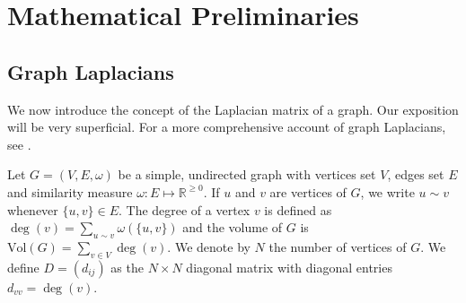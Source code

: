 \chapter{Mathematical Preliminaries}
\section{Graph Laplacians}
\label{sec:graph-laplacians}
We now introduce the concept of the Laplacian matrix of a graph. Our
exposition will be very superficial. For a more comprehensive account
of graph Laplacians, see
\citep{chung05:_laplac_cheeg,cvetkovic80:_spect_graph_theor_applic}.

Let $G = (V,E,\omega)$ be a simple, undirected graph with vertices set
$V$, edges set $E$ and similarity measure $\omega \colon E \mapsto
\mathbb{R}^{\geq 0}$. If $u$ and $v$ are vertices of $G$, we write $u
\sim v$ whenever $\{u,v\} \in E$. The degree of a vertex $v$ is
defined as $\deg(v) = \sum_{u \sim v}{\omega(\{u,v\})}$ and the volume
of $G$ is $\mathrm{Vol}(G) = \sum_{v \in V}{\deg(v)}$.  We denote by
$N$ the number of vertices of $G$. We define $D = (d_{ij})$ as the $N
\times N$ diagonal matrix with diagonal entries $d_{vv} = \deg(v)$.

